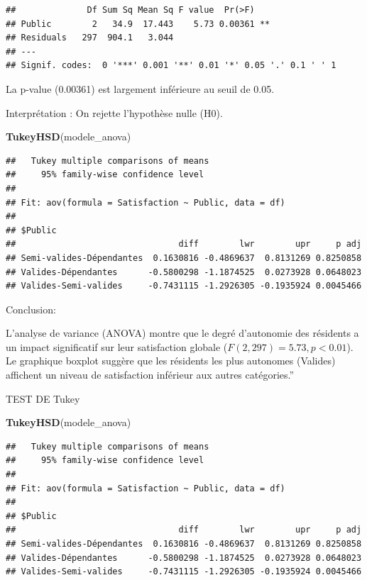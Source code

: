 \documentclass[
]{article}
\newenvironment{Shaded}{\begin{snugshade}}{\end{snugshade}}
\newcommand{\FunctionTok}[1]{\textcolor[rgb]{0.13,0.29,0.53}{\textbf{#1}}}
\newcommand{\NormalTok}[1]{#1}
\begin{document}
\begin{verbatim}
##              Df Sum Sq Mean Sq F value  Pr(>F)   
## Public        2   34.9  17.443    5.73 0.00361 **
## Residuals   297  904.1   3.044                   
## ---
## Signif. codes:  0 '***' 0.001 '**' 0.01 '*' 0.05 '.' 0.1 ' ' 1
\end{verbatim}

La p-value (0.00361) est largement inférieure au seuil de 0.05.

Interprétation : On rejette l'hypothèse nulle (H0).

\begin{Shaded}
\begin{Highlighting}[]
\FunctionTok{TukeyHSD}\NormalTok{(modele\_anova)}
\end{Highlighting}
\end{Shaded}

\begin{verbatim}
##   Tukey multiple comparisons of means
##     95% family-wise confidence level
## 
## Fit: aov(formula = Satisfaction ~ Public, data = df)
## 
## $Public
##                                diff        lwr        upr     p adj
## Semi-valides-Dépendantes  0.1630816 -0.4869637  0.8131269 0.8250858
## Valides-Dépendantes      -0.5800298 -1.1874525  0.0273928 0.0648023
## Valides-Semi-valides     -0.7431115 -1.2926305 -0.1935924 0.0045466
\end{verbatim}

Conclusion:

L'analyse de variance (ANOVA) montre que le degré d'autonomie des
résidents a un impact significatif sur leur satisfaction globale
(\(F(2, 297) = 5.73, p < 0.01\)). Le graphique boxplot suggère que les
résidents les plus autonomes (Valides) affichent un niveau de
satisfaction inférieur aux autres catégories.''

TEST DE Tukey

\begin{Shaded}
\begin{Highlighting}[]
\FunctionTok{TukeyHSD}\NormalTok{(modele\_anova)}
\end{Highlighting}
\end{Shaded}

\begin{verbatim}
##   Tukey multiple comparisons of means
##     95% family-wise confidence level
## 
## Fit: aov(formula = Satisfaction ~ Public, data = df)
## 
## $Public
##                                diff        lwr        upr     p adj
## Semi-valides-Dépendantes  0.1630816 -0.4869637  0.8131269 0.8250858
## Valides-Dépendantes      -0.5800298 -1.1874525  0.0273928 0.0648023
## Valides-Semi-valides     -0.7431115 -1.2926305 -0.1935924 0.0045466
\end{verbatim}
\end{document}
